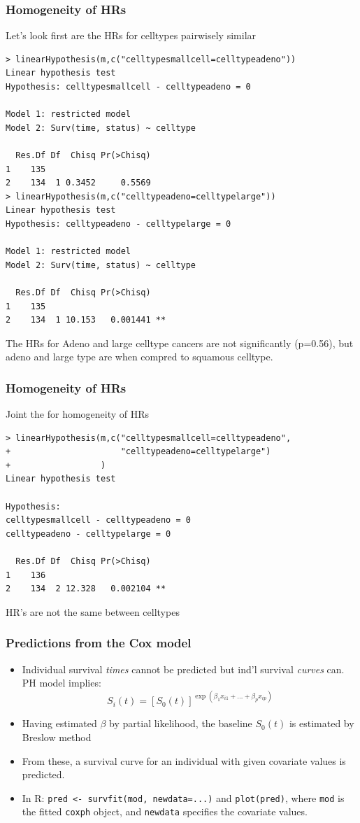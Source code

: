 \documentclass[12pt]{beamer}
\begin{document}
\begin{frame}[fragile]
\frametitle{Homogeneity of HRs}

Let's look first are the HRs for celltypes pairwisely similar
{\scriptsize 
\begin{verbatim}
> linearHypothesis(m,c("celltypesmallcell=celltypeadeno"))
Linear hypothesis test
Hypothesis: celltypesmallcell - celltypeadeno = 0

Model 1: restricted model
Model 2: Surv(time, status) ~ celltype

  Res.Df Df  Chisq Pr(>Chisq)
1    135                     
2    134  1 0.3452     0.5569
> linearHypothesis(m,c("celltypeadeno=celltypelarge"))
Linear hypothesis test
Hypothesis: celltypeadeno - celltypelarge = 0

Model 1: restricted model
Model 2: Surv(time, status) ~ celltype

  Res.Df Df  Chisq Pr(>Chisq)   
1    135                        
2    134  1 10.153   0.001441 **
\end{verbatim}
}
The HRs for Adeno and large celltype cancers are not significantly (p=0.56),  but adeno and large type are when compred to squamous celltype.  

\end{frame}


\begin{frame}[fragile]
\frametitle{Homogeneity of HRs}

Joint the for homogeneity of HRs

{\footnotesize \begin{verbatim}
> linearHypothesis(m,c("celltypesmallcell=celltypeadeno",
+                      "celltypeadeno=celltypelarge")
+                  )
Linear hypothesis test

Hypothesis:
celltypesmallcell - celltypeadeno = 0
celltypeadeno - celltypelarge = 0

  Res.Df Df  Chisq Pr(>Chisq)   
1    136                        
2    134  2 12.328   0.002104 **

\end{verbatim}
}
HR's are not the same between celltypes

\end{frame}


\begin{frame}[fragile]
\frametitle{Predictions from the Cox model}
\begin{itemize}
\item
Individual survival \textit{times} cannot be predicted
but ind'l survival \emph{curves} can.
PH model implies:
\[
S_i(t) = [S_0(t) ]^{\exp(\beta_1 x_{i1} +\ldots+\beta_p x_{ip})}
\]
\item
Having  estimated $\beta$ by partial likelihood, 
the baseline $S_0(t)$ is estimated by Breslow method 
\item 
\medskip
 From these, a survival curve for an individual
with given covariate values is predicted.
\item
\medskip
In R: 
\texttt{pred <- survfit(mod, newdata=...)} 
and \texttt{plot(pred)}, where \texttt{mod} is the fitted
\texttt{coxph} object, 
and \texttt{newdata}  
specifies the covariate values.
\end{itemize}
\end{frame}
\end{document}
